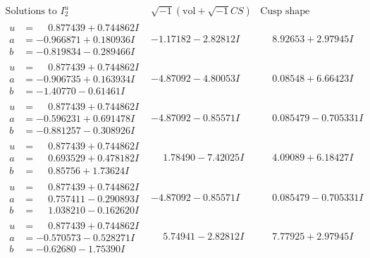\documentclass[1p]{elsarticle_modified}
\theoremstyle{definition}
\newcommand{\I}{\sqrt{-1}}
\begin{document}
$$\begin{array}{c|c|c}  
\text{Solutions to }I^u_{2}& \I (\text{vol} + \sqrt{-1}CS) & \text{Cusp shape}\\
 \hline 
\begin{aligned}
u &= \phantom{-}0.877439 + 0.744862 I \\
a &= -0.966871 + 0.180936 I \\
b &= -0.819834 - 0.289466 I\end{aligned}
 & -1.17182 - 2.82812 I & \phantom{-}8.92653 + 2.97945 I \\ \hline\begin{aligned}
u &= \phantom{-}0.877439 + 0.744862 I \\
a &= -0.906735 + 0.163934 I \\
b &= -1.40770 - 0.61461 I\end{aligned}
 & -4.87092 - 4.80053 I & \phantom{-}0.08548 + 6.66423 I \\ \hline\begin{aligned}
u &= \phantom{-}0.877439 + 0.744862 I \\
a &= -0.596231 + 0.691478 I \\
b &= -0.881257 - 0.308926 I\end{aligned}
 & -4.87092 - 0.85571 I & \phantom{-}0.085479 - 0.705331 I \\ \hline\begin{aligned}
u &= \phantom{-}0.877439 + 0.744862 I \\
a &= \phantom{-}0.693529 + 0.478182 I \\
b &= \phantom{-}0.85756 + 1.73624 I\end{aligned}
 & \phantom{-}1.78490 - 7.42025 I & \phantom{-}4.09089 + 6.18427 I \\ \hline\begin{aligned}
u &= \phantom{-}0.877439 + 0.744862 I \\
a &= \phantom{-}0.757411 - 0.290893 I \\
b &= \phantom{-}1.038210 - 0.162620 I\end{aligned}
 & -4.87092 - 0.85571 I & \phantom{-}0.085479 - 0.705331 I \\ \hline\begin{aligned}
u &= \phantom{-}0.877439 + 0.744862 I \\
a &= -0.570573 - 0.528271 I \\
b &= -0.62680 - 1.75390 I\end{aligned}
 & \phantom{-}5.74941 - 2.82812 I & \phantom{-}7.77925 + 2.97945 I \\ \hline\begin{aligned}

\end{aligned}
\end{array}$$
\end{document}
